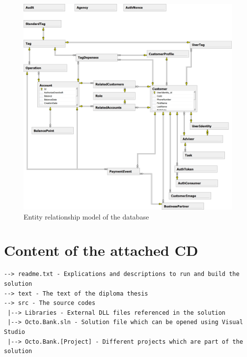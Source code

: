\documentclass[11pt,twoside,a4paper]{book}
\begin{document}
\begin{figure}[h]
\begin{center}
\includegraphics[width=14cm]{figures/db_diagram_all}
\caption{Entity relationship model of the database}
\label{fig:er_model}
\end{center}
\end{figure}



\chapter{Content of the attached CD}
\begin{verbatim}
--> readme.txt - Explications and descriptions to run and build the solution
--> text - The text of the diploma thesis
--> src - The source codes
 |--> Libraries - External DLL files referenced in the solution
 |--> Octo.Bank.sln - Solution file which can be opened using Visual Studio
 |--> Octo.Bank.[Project] - Different projects which are part of the solution
\end{verbatim}
\end{document}
